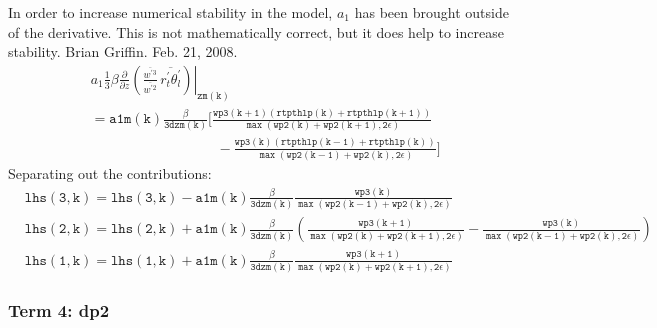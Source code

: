 \documentclass[11pt,fleqn]{article}
\newcommand{\ptlder}[2]{\frac{\partial #1}{\partial #2}}
\begin{document}
%
In order to increase numerical stability in the model, $a_{1}$ has been brought
outside of the derivative.  This is not mathematically correct, but it does 
help to increase stability.  Brian Griffin.  Feb. 21, 2008.
% 
\begin{equation}
\begin{split}
& \left.
  a_1
  \frac{1}{3} \beta
   \ptlder{}{z}
     \left( 
       \frac{\overline{w^{'3}}}{\overline{w^{'2}}} \,
       \overline{r_t^{'}\theta_l^{'}}
     \right)
   \right|_{\mathtt{zm(k)}} \\
&= \mathtt{
    a1m(k)
    \frac{\beta}{3 dzm(k)}
    \bigg[ \frac{wp3(k+1) \left(rtpthlp(k)+rtpthlp(k+1) \right)}
                {\max\left(wp2(k)+wp2(k+1),2\epsilon\right)} } \\
&  \mathtt{ \quad \quad \quad \quad \quad \quad \quad \quad \quad
          -\frac{wp3(k) \left(rtpthlp(k-1)+rtpthlp(k) \right)}
                {\max\left(wp2(k-1)+wp2(k),2\epsilon\right)}
    \bigg]
    }
\end{split}
\end{equation}
%
Separating out the contributions:
%
\begin{equation}
\begin{split}
& \mathtt{ 
   lhs(3,k) = lhs(3,k) - a1m(k)\frac{\beta}{3 dzm(k)}
                 \frac{wp3(k)}
                      {\max\left(wp2(k-1)+wp2(k),2\epsilon\right)}
  } \\
& \mathtt{
   lhs(2,k) = lhs(2,k) + a1m(k)\frac{\beta}{3 dzm(k)}
                 \left(
                   \frac{wp3(k+1)}
                        {\max\left(wp2(k)+wp2(k+1),2\epsilon\right)}
                  -\frac{wp3(k)}
                        {\max\left(wp2(k-1)+wp2(k),2\epsilon\right)}
                 \right)
  } \\
& \mathtt{
   lhs(1,k) = lhs(1,k) + a1m(k)\frac{\beta}{3 dzm(k)}
                 \frac{wp3(k+1)}
                      {\max\left(wp2(k)+wp2(k+1),2\epsilon\right)}
  }
\end{split}
\end{equation}
 
\subsubsection{Term 4:  dp2}
\end{document}
